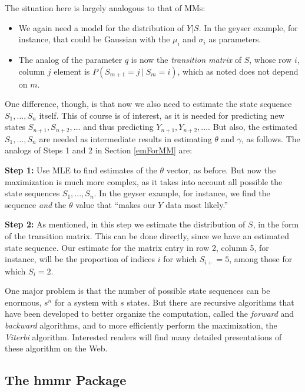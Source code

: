 \documentclass[11pt]{article}
\begin{document}
The situation here is largely analogous to that of MMs:  

\begin{itemize}

\item We again need a model for the distribution of $Y | S$.  In the
geyser example, for instance, that could be Gaussian with the
$\mu_i$ and $\sigma_i$ as parameters.

\item The analog of the parameter $q$ is now the \textit{transition
matrix} of $S$, whose row $i$, column $j$ element is $P(S_{m+1} = j
~|~ S_m = i)$, which as noted does not depend on $m$.

\end{itemize} 

One difference, though, is that now we also need to estimate the state
sequence $S_1,...,S_n$ itself.  This of course is of interest, as it is
needed for predicting new states $S_{n+1}, S_{n+2},...$ and thus
predicting $Y_{n+1}, Y_{n+2},...$.  But also, the estimated
$S_1,...,S_n$ are needed as intermediate results in estimating $\theta$
and $\gamma$, as follows.  The analogs of Steps 1 and 2 in Section
\ref{emForMM} are:

\textbf{Step 1:} Use MLE to find estimates of the $\theta$ vector, as
before.  But now the maximization is much more complex, as it takes into
account all possible the state sequences $S_1,...,S_n$.  In the geyser
example, for instance, we find the sequence \textit{and} the $\theta$
value that ``makes our $Y$ data most likely.''

\textbf{Step 2:} As mentioned, in this step we estimate the distribution
of $S$, in the form of the transition matrix.  This can be done
directly, since we have an estimated state sequence.  Our estimate for
the matrix entry in row 2, column 5, for instance, will be the
proportion of indices $i$ for which $S_{i+} = 5$, among those for which
$S_i = 2$.

One major problem is that the number of possible state sequences can be
enormous, $s^n$ for a system with $s$ states.  But there are recursive
algorithms that have been developed to better organize the computation,
called the \textit{forward} and \textit{backward} algorithms, and to
more efficiently perform the maximization, the \textit{Viterbi}
algorithm.  Interested readers will find many detailed presentations of
these algorithm on the Web.

\subsection{The hmmr Package}
\end{document}
